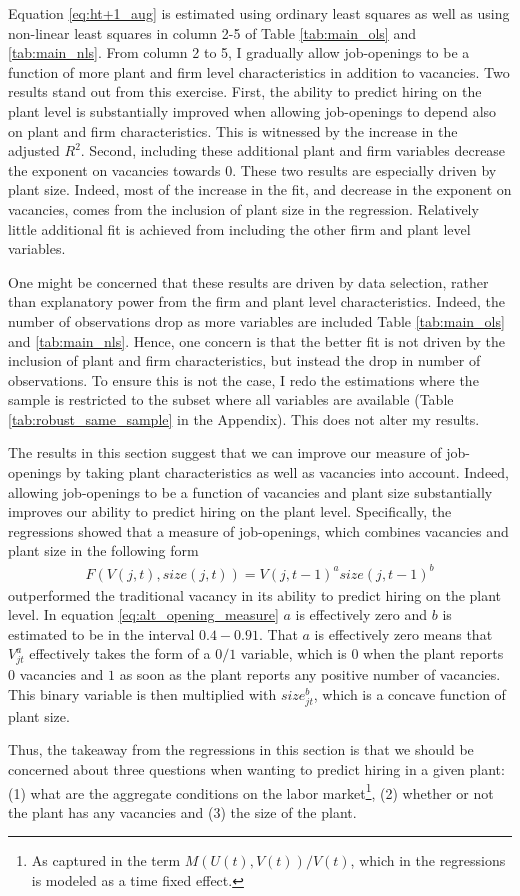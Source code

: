 Equation \eqref{eq:ht+1_aug} is estimated using ordinary least squares as well as using non-linear least squares in column 2-5 of Table \ref{tab:main_ols} and \ref{tab:main_nls}. From column 2 to 5, I gradually allow job-openings to be a function of more plant and firm level characteristics in addition to vacancies. Two results stand out from this exercise. First, the ability to predict hiring on the plant level is substantially improved when allowing job-openings to depend also on plant and firm characteristics. This is witnessed by the increase in the adjusted $R^2$. Second, including these additional plant and firm variables decrease the exponent on vacancies towards $0$. These two results are especially driven by plant size. Indeed, most of the increase in the fit, and decrease in the exponent on vacancies, comes from the inclusion of plant size in the regression. Relatively little additional fit is achieved from including the other firm and plant level variables. 

One might be concerned that these results are driven by data selection, rather than explanatory power from the firm and plant level characteristics. Indeed, the number of observations drop as more variables are included Table \ref{tab:main_ols} and \ref{tab:main_nls}. Hence, one concern is that the better fit is not driven by the inclusion of  plant and firm characteristics, but instead the drop in number of observations. To ensure this is not the case, I redo the estimations where the sample is restricted to the subset where all variables are available (Table \ref{tab:robust_same_sample} in the Appendix). This does not alter my results. 

The results in this section suggest that we can improve our measure of job-openings by taking plant characteristics as well as vacancies into account. Indeed, allowing job-openings to be a function of vacancies and plant size substantially improves our ability to predict hiring on the plant level. Specifically, the regressions showed that a measure of job-openings, which combines vacancies and plant size in the following form
\begin{align}
F(V(j,t), size(j,t))=V(j,t-1)^{a} size(j,t-1)^{b}
\label{eq:alt_opening_measure}
\end{align}
outperformed the traditional vacancy in its ability to predict hiring on the plant level. In equation \eqref{eq:alt_opening_measure}
$a$ is effectively zero and $b$ is estimated to be in the interval $0.4-0.91$. That $a$ is effectively zero means that $V_{jt}^{a}$ effectively takes the form of a $0/1$ variable, which is $0$ when the plant reports $0$ vacancies and $1$ as soon as the plant reports any positive number of vacancies. This binary variable is then multiplied with $size_{jt}^{b}$, which is a concave function of plant size. 

Thus, the takeaway from the regressions in this section is that we should be concerned about three questions when wanting to predict hiring in a given plant: (1) what are the aggregate conditions on the labor market\footnote{As captured in the term $M(U(t),V(t))/V(t)$, which in the regressions is modeled as a time fixed effect.}, (2) whether or not the plant has any vacancies and (3) the size of the plant.

